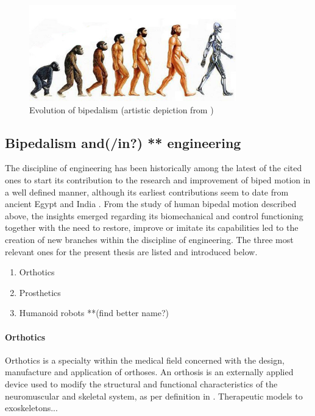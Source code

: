 \begin{figure}[h]
	\centering
	\includegraphics[width=0.8\textwidth]{figures/artificialhumans.jpg}
	\caption{Evolution of bipedalism (artistic depiction from \cite{human_evol_fig})}
	\label{fig:biped_evolution}
\end{figure}

\subsection{Bipedalism and(/in?) ** engineering} %
\label{sub:bipedalism_and_engineering}
The discipline of engineering has been historically among the latest of the cited ones to start its contribution to the research and improvement of biped motion in a well defined manner, although its earliest contributions seem to date from ancient Egypt and India \cite{prosthetics_history}.
From the study of human bipedal motion described above, the insights emerged regarding its biomechanical and control functioning together with the need to restore, improve or imitate its capabilities led to the creation of new branches within the discipline of engineering.
The three most relevant ones for the present thesis are listed and introduced below.

\begin{enumerate}
	\item Orthotics
	\item Prosthetics
	\item Humanoid robots  **(find better name?)
\end{enumerate}

\paragraph{Orthotics} %
\label{par:orthotics}
Orthotics is a specialty within the medical field concerned with the design, manufacture and application of orthoses. An orthosis is an externally applied device used to modify the structural and functional characteristics of the neuromuscular and skeletal system, as per definition in \cite{ISO_orthosis}.
Therapeutic models to exoskeletons... 

